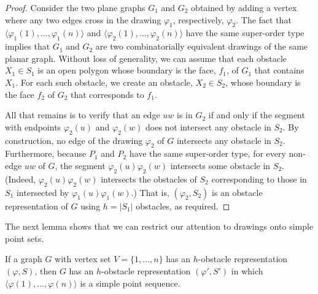 \documentclass{patmorin}
\begin{document}
\begin{proof}
  Consider the two plane graphs $G_1$ and $G_2$ obtained by
  adding a vertex where any two edges cross in the drawing
  $\varphi_1$, respectively, $\varphi_2$.  The fact that
  $\langle\varphi_1(1),\ldots,\varphi_1(n)\rangle$ and
  $\langle\varphi_2(1),\ldots,\varphi_2(n)\rangle$ have the same
  super-order type implies that $G_1$ and $G_2$ are two combinatorially
  equivalent drawings of the same planar graph.  Without loss of
  generality, we can assume that each obstacle $X_1\in S_1$ is an open
  polygon whose boundary is the face, $f_1$, of $G_1$ that contains $X_1$.
  For each such obstacle, we create an obstacle, $X_2\in S_2$, whose boundary
  is the face $f_2$ of $G_2$ that corresponds to $f_1$.  

  All that remains is to verify that an edge $uw$ is in $G_2$ if and
  only if the segment with endpoints $\varphi_2(u)$ and $\varphi_2(w)$
  does not intersect any obstacle in $S_2$.  By construction, no edge
  of the drawing $\varphi_2$ of $G$ intersects any obstacle in $S_2$.
  Furthermore, because $P_1$ and $P_2$ have the same super-order type,
  for every non-edge $uw$ of $G$, the segment $\varphi_2(u)\varphi_2(w)$
  intersects some obstacle in $S_2$. (Indeed, $\varphi_2(u)\varphi_2(w)$
  intersects the obstacles of $S_2$ corresponding to those in $S_1$
  intersected by $\varphi_1(u)\varphi_1(w)$.)  That is, $(\varphi_2,S_2)$
  is an obstacle representation of $G$ using $h=|S_1|$ obstacles,
  as required.
\end{proof}

The next lemma shows that we can restrict our attention to drawings
onto simple point sets.

\begin{lem}
  If a graph $G$ with vertex set $V=\{1,\ldots,n\}$ has an
  $h$-obstacle representation $(\varphi, S)$, then $G$ has an
  $h$-obstacle representation $(\varphi',S')$ in which $\langle
  \varphi(1),\ldots,\varphi(n)\rangle$ is a simple point sequence.
\end{lem}
\end{document}
